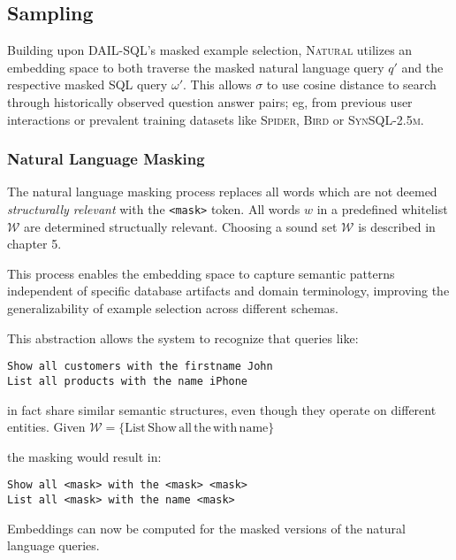 \subsection{Sampling}\label{design:sampling}

Building upon DAIL-SQL's masked example selection, \textsc{Natural} utilizes an
embedding space to both traverse the masked natural language query $q'$
and the respective masked SQL query $\omega'$. This allows $\sigma$ to use
cosine distance to search through historically observed question answer pairs;
eg, from previous user interactions or prevalent training datasets like
\textsc{Spider}, \textsc{Bird} or \textsc{SynSQL-2.5m}.


\subsubsection{Natural Language Masking}

The natural language masking process replaces all words which are not deemed
\textit{structurally relevant} with the \texttt{<mask>} token. All words $w$
in a predefined whitelist $\mathcal{W}$ are determined structually relevant.
Choosing a sound set $\mathcal{W}$ is described in chapter 5.

This process enables the embedding space to capture semantic patterns independent
of specific database artifacts and domain terminology, improving the generalizability
of example selection across different schemas.

This abstraction allows the system to recognize that queries like:

\begin{verbatim}
Show all customers with the firstname John
List all products with the name iPhone
\end{verbatim}

in fact share similar semantic structures, even though they operate on different entities.
Given $\mathcal{W} = \{\text{List}\, \text{Show}\, \text{all}\, \text{the}\, \text{with}\, \text{name}\}$

the masking would result in:

\begin{verbatim}
Show all <mask> with the <mask> <mask>
List all <mask> with the name <mask>
\end{verbatim}

Embeddings can now be computed for the masked versions of the natural language queries.

